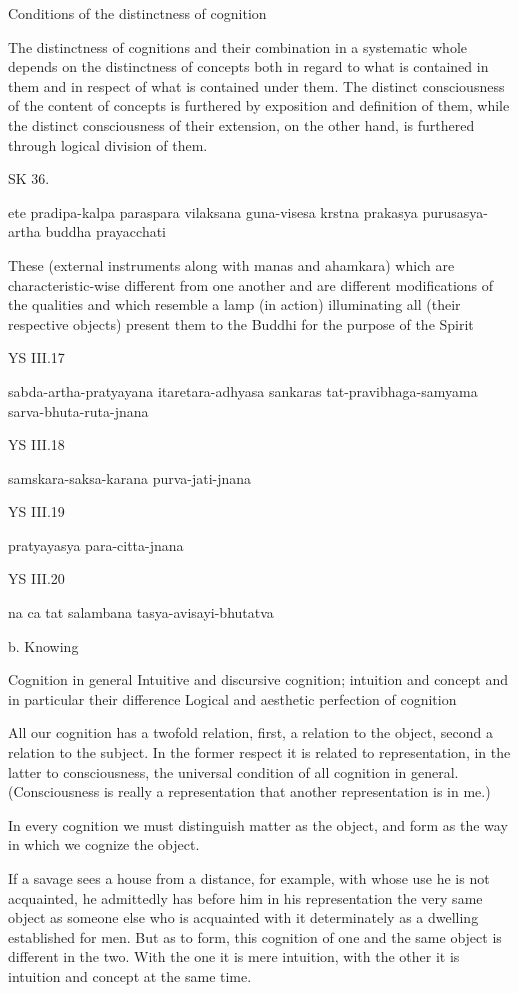     Conditions of the distinctness of cognition

    The distinctness of cognitions and their combination
    in a systematic whole depends on the distinctness of concepts
    both in regard to what is contained in them
    and in respect of what is contained under them.
    The distinct consciousness of
    the content of concepts is furthered
    by exposition and definition of them,
    while the distinct consciousness of
    their extension, on the other hand,
    is furthered through logical division of them.

SK 36.

ete pradipa-kalpa paraspara vilaksana guna-visesa
krstna prakasya purusasya-artha buddha prayacchati

These (external instruments along with manas and ahamkara)
which are characteristic-wise different from one another
and are different modifications of the qualities
and which resemble a lamp (in action)
illuminating all (their respective objects)
present them to the Buddhi for the purpose of the Spirit

YS III.17

    sabda-artha-pratyayana itaretara-adhyasa sankaras
    tat-pravibhaga-samyama sarva-bhuta-ruta-jnana

YS III.18

    samskara-saksa-karana purva-jati-jnana

YS III.19

    pratyayasya para-citta-jnana

YS III.20

    na ca tat salambana tasya-avisayi-bhutatva

    b. Knowing

    Cognition in general
        Intuitive and discursive cognition;
            intuition and concept
            and in particular their difference
        Logical and aesthetic perfection of cognition

    All our cognition has a twofold relation,
    first, a relation to the object,
    second a relation to the subject.
    In the former respect it is related to representation,
    in the latter to consciousness,
    the universal condition of all cognition in general.
    (Consciousness is really a representation
    that another representation is in me.)

    In every cognition we must distinguish matter as the object,
    and form as the way in which we cognize the object.

        If a savage sees a house from a distance, for example,
        with whose use he is not acquainted,
        he admittedly has before him in his representation
        the very same object as someone else
        who is acquainted with it determinately
        as a dwelling established for men.
        But as to form, this cognition of one and the same object
        is different in the two.
        With the one it is mere intuition,
        with the other it is intuition and concept at the same time.

